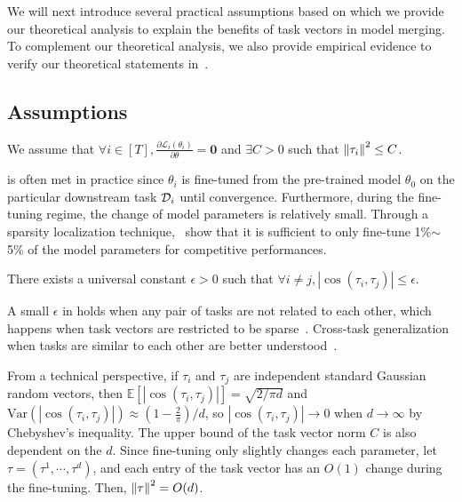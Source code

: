 We will next introduce several practical assumptions based on which we provide our theoretical analysis to explain the benefits of task vectors in model merging. To complement our theoretical analysis, we also provide empirical evidence to verify our theoretical statements in~.

\subsection{Assumptions}

\begin{assumption}
    We assume that $\forall i\in [T], \frac{\partial\mathcal{L}_i(\theta_i)}{\partial{\theta}} = \mathbf{0}$ and $\exists C > 0$ such that $\left\lVert\tau_i\right\rVert^2 \leq C$.
\label{ass:finetuning}
\end{assumption}
 is often met in practice since $\theta_i$ is fine-tuned from the pre-trained model $\theta_0$ on the particular downstream task ${\cal D}_i$ until convergence. Furthermore, during the fine-tuning regime, the change of model parameters is relatively small. Through a sparsity localization technique,~\citet{he2024localize} show that it is sufficient to only fine-tune 1\%$\sim$5\% of the model parameters for competitive performances.

\begin{assumption} There exists a universal constant $\epsilon > 0$ such that $\forall i\neq j, |\cos(\tau_i, \tau_j)| \leq \epsilon$.
\label{ass:orthogonality}
\end{assumption}

A small $\epsilon$ in  holds when any pair of tasks are not related to each other, which happens when task vectors are restricted to be sparse~\citep{he2024localize}. Cross-task generalization when tasks are similar to each other are better understood~\citep{tripuraneni2020theory,hu2024revisiting}. 
\begin{remark}
From a technical perspective, if $\tau_i$ and $\tau_j$ are independent standard Gaussian random vectors, then $\mathbb{E}[|\cos(\tau_i, \tau_j)|] = \sqrt{2/\pi d}$ and $\text{Var}(|\cos(\tau_i, \tau_j)|) \approx (1 - \frac{2}{\pi})/d$, so $|\cos(\tau_i, \tau_j)| \to 0$ when $d \to \infty$ by Chebyshev’s inequality. The upper bound of the task vector norm $C$ is also dependent on the $d$. Since fine-tuning only slightly changes each parameter, let $\tau = (\tau^1, \cdots, \tau^d)$, and each entry of the task vector has an $O(1)$ change during the fine-tuning. Then, $\left\lVert\tau\right\rVert^2 = O(d)$.
\end{remark}

